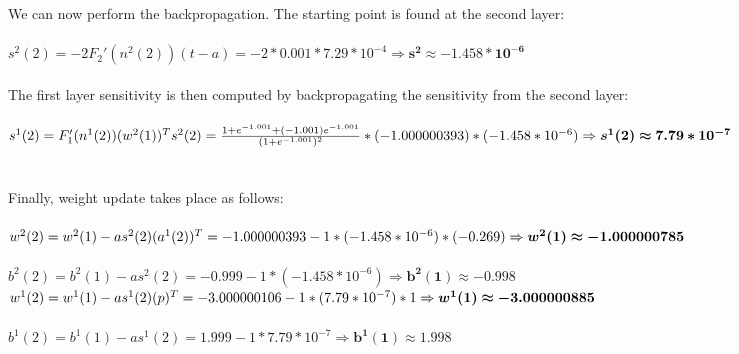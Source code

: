 \documentclass{article}
\begin{document}
\newpage
\noindent We can now perform the backpropagation. The starting point is found at the second layer: \\ \\
$s^2(2) = -2F_2'(n^2(2))(t-a) = -2 * 0.001 * 7.29 * 10^{-4} \Rightarrow \bm{s^2 \approx -1.458 * 10^{-6}}$
\\\\ The first layer sensitivity is then computed by backpropagating the sensitivity from the second layer: \\ \\ $s^1(2) = F_1'(n^1(2))(w^2(1))^Ts^2(2) = \frac{1+e^{-1.001}+(-1.001)e^{-1.001}}{(1+e^{-1.001})^2} * (-1.000000393) *(-1.458 * 10^{-6}) \\\\\Rightarrow \bm{s^1(2) \approx 7.79 * 10^{-7}}$
\\\\ \\Finally, weight update takes place as follows: \\\\
$w^2(2) = w^2(1) - as^2(2)(a^1(2))^T = -1.000000393 -1 * (-1.458 * 10 ^{-6}) * (-0.269) \newline \\\Rightarrow \bm{w^2(1) \approx -1.000000785}$
\\ \\ $b^2(2) = b^2(1) -as^2(2) = -0.999 -1 * (-1.458 * 10 ^ {-6}) \Rightarrow \bm{b^2(1) \approx -0.998}$
$\\ \\ \\ w^1(2) = w^1(1) -as^1(2)(p)^T = -3.000000106 -1 * (7.79 * 10^{-7}) * 1 \Rightarrow \bm{w^1(1) \approx -3.000000885} $ 
\\ \\$b^1(2) = b^1(1) - as^1(2) = 1.999 - 1 * 7.79 * 10^{-7} \Rightarrow \bm{b^1(1) \approx 1.998}$\\ \\ \\

\end{document}
